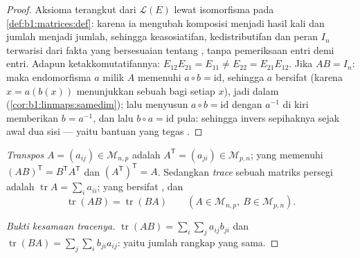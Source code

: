 \begin{proof}
Aksioma  terangkut dari $\mathcal{L}(E)$ lewat
isomorfisma pada \cref{def:b1:matrices:def}: karena ia mengubah
komposisi menjadi hasil kali dan jumlah menjadi jumlah, sehingga keasosiatifan,
kedistributifan dan peran $I_n$ terwarisi dari fakta yang
bersesuaian tentang , tanpa pemeriksaan entri demi entri.
Adapun ketakkomutatifannya: $E_{12}E_{21} = E_{11} \neq E_{22}
= E_{21}E_{12}$. Jika $AB = I_n$: maka endomorfisma $a$ milik $A$
memenuhi $a \circ b = \mathrm{id}$, sehingga $a$ bersifat  (karena $x =
a(b(x))$ menunjukkan sebuah  bagi setiap $x$), jadi  dalam
 (\cref{cor:b1:linmaps:samedim}); lalu menyusun $a
\circ b = \mathrm{id}$ dengan $a^{-1}$ di kiri memberikan $b =
a^{-1}$, dan lalu $b\circ a = \mathrm{id}$ pula: sehingga invers sepihaknya
sejak awal dua sisi --- yaitu bantuan yang tegas
.
\end{proof}

\begin{definition}\label{def:b1:matrices:transpose}
\emph{Transpos} $A = (a_{ij}) \in \mathcal{M}_{n,p}$ adalah $A^{\mathsf T}
= (a_{ji}) \in \mathcal{M}_{p,n}$; yang memenuhi $(AB)^{\mathsf T} = B^{\mathsf T}
A^{\mathsf T}$ dan $(A^{\mathsf T})^{\mathsf T} = A$. Sedangkan
\emph{trace} sebuah matriks persegi adalah $\operatorname{tr} A
= \sum_i a_{ii}$; yang bersifat , dan
\[
\operatorname{tr}(AB) = \operatorname{tr}(BA)
\qquad (A \in \mathcal{M}_{n,p},\ B \in \mathcal{M}_{p,n}).
\]
\end{definition}

\begin{proof}[Bukti kesamaan tracenya]
$\operatorname{tr}(AB) = \sum_i \sum_j a_{ij} b_{ji}$ dan
$\operatorname{tr}(BA) = \sum_j \sum_i b_{ji} a_{ij}$: yaitu jumlah
rangkap yang sama.
\end{proof}

